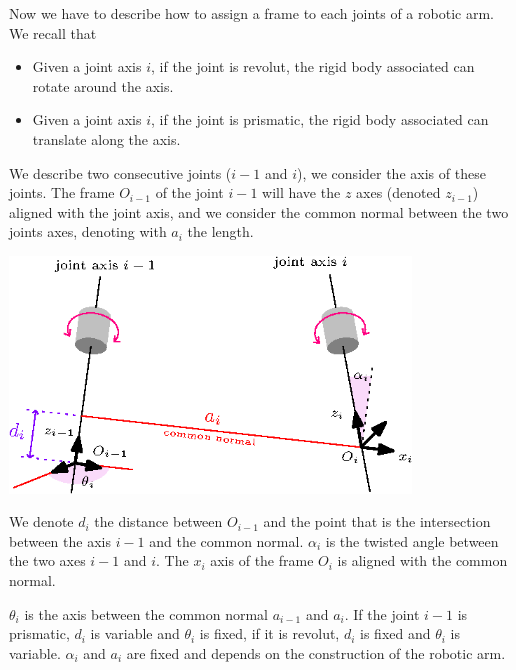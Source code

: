 \documentclass[10pt, letterpaper]{report}
\begin{document}
Now we have to describe how to assign a frame to each joints of a robotic arm. We recall that\begin{itemize}
    \item Given a joint axis $i$, if the joint is revolut, the rigid body associated can rotate around the axis. 
    \item Given a joint axis $i$, if the joint is prismatic, the rigid body associated can translate along the axis. 
\end{itemize}
We describe two consecutive joints ($i-1$ and $i$), we consider the axis of these joints. The frame $O_{i-1}$ of the joint $i-1$ will have the $z$ axes (denoted $z_{i-1}$) aligned with the joint axis, and we consider the common normal between the two joints axes, denoting with $a_i$ the length.
\begin{center}
    \includegraphics[width=0.8\textwidth ]{images/DH_frames.eps}
\end{center}
We denote $d_i$ the distance between $O_{i-1}$ and the point that is the intersection between the axis $i-1$ and the common normal. $\alpha_i$ is the twisted angle between the two axes $i-1$ and $i$. The $x_i$ axis of the frame $O_i$ is aligned with the common normal.\bigskip 

$\theta_i$ is the axis between the common normal $a_{i-1}$ and $a_i$. If the joint $i-1$ is prismatic, $d_i$ is variable and $\theta_i$ is fixed, if it is revolut, $d_i$ is fixed and $\theta_i$ is variable. $\alpha_i$ and $a_i$ are fixed and depends on the construction of the robotic arm. \bigskip 
\end{document}
